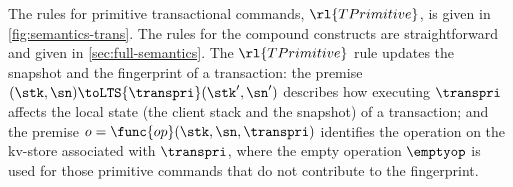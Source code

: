\begin{figure*}[!t]
\begin{center}
\noindent
{}
\end{center}

\spaceshrink{-10pt}

\hrulefill

\caption{The semantics of transactional commands}
\label{fig:semantics-trans}
\end{figure*}
 
The rules for primitive transactional commands, \( \rl{TPrimitive} \),
is given in \cref{fig:semantics-trans}.
The rules for the compound constructs are straightforward and given in \cref{sec:full-semantics}.
The \( \rl{TPrimitive} \) rule updates 
the snapshot and the fingerprint of a transaction: the premise 
\((\stk, \sn) \toLTS{\transpri} (\stk', \sn')\) describes how executing
\(\transpri\) affects the local state (the client stack and the snapshot) of a transaction; 
and the premise \(o =\func{op}(\stk, \sn, \transpri)\) identifies the operation on the kv-store associated with \(\transpri\), 
where the empty operation \(\emptyop\) is used for those primitive commands that do not
contribute to the fingerprint.



